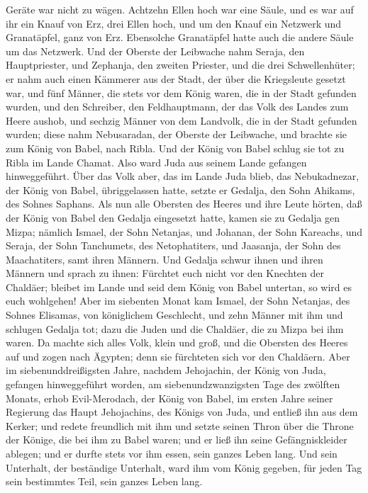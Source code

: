 Geräte war nicht zu wägen.  Achtzehn Ellen hoch war eine
Säule, und es war auf ihr ein Knauf von Erz, drei Ellen hoch, und um den
Knauf ein Netzwerk und Granatäpfel, ganz von Erz. Ebensolche Granatäpfel
hatte auch die andere Säule um das Netzwerk.  Und der
Oberste der Leibwache nahm Seraja, den Hauptpriester, und Zephanja, den
zweiten Priester, und die drei Schwellenhüter;  er nahm
auch einen Kämmerer aus der Stadt, der über die Kriegsleute gesetzt war,
und fünf Männer, die stets vor dem König waren, die in der Stadt
gefunden wurden, und den Schreiber, den Feldhauptmann, der das Volk des
Landes zum Heere aushob, und sechzig Männer von dem Landvolk, die in der
Stadt gefunden wurden;  diese nahm Nebusaradan, der
Oberste der Leibwache, und brachte sie zum König von Babel, nach Ribla.
 Und der König von Babel schlug sie tot zu Ribla im Lande
Chamat. Also ward Juda aus seinem Lande gefangen hinweggeführt.
 Über das Volk aber, das im Lande Juda blieb, das
Nebukadnezar, der König von Babel, übriggelassen hatte, setzte er
Gedalja, den Sohn Ahikams, des Sohnes Saphans.  Als nun
alle Obersten des Heeres und ihre Leute hörten, daß der König von Babel
den Gedalja eingesetzt hatte, kamen sie zu Gedalja gen Mizpa; nämlich
Ismael, der Sohn Netanjas, und Johanan, der Sohn Kareachs, und Seraja,
der Sohn Tanchumets, des Netophatiters, und Jaasanja, der Sohn des
Maachatiters, samt ihren Männern.  Und Gedalja schwur
ihnen und ihren Männern und sprach zu ihnen: Fürchtet euch nicht vor den
Knechten der Chaldäer; bleibet im Lande und seid dem König von Babel
untertan, so wird es euch wohlgehen!  Aber im siebenten
Monat kam Ismael, der Sohn Netanjas, des Sohnes Elisamas, von
königlichem Geschlecht, und zehn Männer mit ihm und schlugen Gedalja
tot; dazu die Juden und die Chaldäer, die zu Mizpa bei ihm waren.
 Da machte sich alles Volk, klein und groß, und die
Obersten des Heeres auf und zogen nach Ägypten; denn sie fürchteten sich
vor den Chaldäern.  Aber im siebenunddreißigsten Jahre,
nachdem Jehojachin, der König von Juda, gefangen hinweggeführt worden,
am siebenundzwanzigsten Tage des zwölften Monats, erhob Evil-Merodach,
der König von Babel, im ersten Jahre seiner Regierung das Haupt
Jehojachins, des Königs von Juda, und entließ ihn aus dem Kerker;
 und redete freundlich mit ihm und setzte seinen Thron
über die Throne der Könige, die bei ihm zu Babel waren; 
und er ließ ihn seine Gefängniskleider ablegen; und er durfte stets vor
ihm essen, sein ganzes Leben lang.  Und sein Unterhalt,
der beständige Unterhalt, ward ihm vom König gegeben, für jeden Tag sein
bestimmtes Teil, sein ganzes Leben lang.
